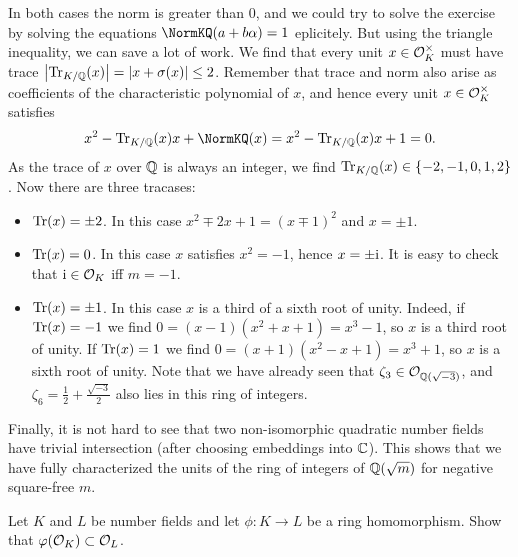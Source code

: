 \documentclass[a4paper,11pt]{article}
\begin{document}
\begin{enumerate}
\begin{equation*}
        \end{equation*}
        In both cases the norm is greater than $0$, and we could try to solve
        the exercise by solving the equations
        $\NormKQ(a + b\alpha) = 1$ eplicitely. But using the triangle
        inequality, we can save a lot of work. We find that every
        unit $x \in \mathcal{O}_K^\times$ must have trace $\left\lvert \operatorname{Tr}_{K/\mathbb{Q}}(x) \right\rvert = \left\lvert x +
        \sigma(x) \right\rvert \leq 2$. Remember that trace and norm also arise as coefficients
        of the characteristic polynomial of $x$, and hence every unit
        $x \in \mathcal{O}_K^\times$ satisfies
        \begin{equation*}
            x^2 - \Tr_{K/\Q}(x) x + \NormKQ(x) = x^2 - \Tr_{K/\Q}(x) x + 1 = 0.
        \end{equation*}
        As the trace of $x$ over $\mathbb{Q}$ is always an integer, we find 
        $\operatorname{Tr}_{K/\mathbb{Q}}(x) \in \{-2,-1,0,1,2\}$. 
        Now there are three tracases:
        \begin{itemize}
            \item $\operatorname{Tr}(x) = \pm 2$. In this case $x^2 \mp 2x + 1 = (x \mp 1)^2$
                and $x = \pm 1$. 
            \item $\operatorname{Tr}(x) = 0$. In this case $x$ satisfies $x^2 = -1$, hence
                $x = \pm \mathrm i$. It is easy to check that $\mathrm i \in \mathcal{O}_K$ iff 
                $m = -1$. 
            \item $\operatorname{Tr}(x) = \pm 1$. In this case $x$ is a third of a sixth root of
                unity. Indeed, if $\operatorname{Tr}(x) = -1$ we find $0 = (x-1)(x^2 + x + 1)
                = x^3 - 1$, so $x$ is a third root of unity. If $\operatorname{Tr}(x) = 1$ we
                find $0 = (x+1)(x^2 - x + 1) = x^3 + 1$, so $x$ is a sixth root
                of unity. Note that we have already seen that $\zeta_3 \in
                \mathcal{O}_{\mathbb{Q}(\sqrt{-3})}$, and $\zeta_6 = \frac 12 +
                \frac{\sqrt{-3}}2$ also lies in this ring of integers.  
        \end{itemize}
        Finally, it is not hard to see that two non-isomorphic quadratic number
        fields have trivial intersection (after choosing embeddings into $\mathbb{C}$).
        This shows that we have fully characterized the units of
        the ring of integers of $\mathbb{Q}(\sqrt m)$ for negative square-free $m$. 



\end{enumerate}

Let $K$ and $L$ be number fields and let $\phi: K \to L$ be a ring homomorphism.
Show that $\varphi(\mathcal{O}_K) \subset \mathcal{O}_L$.
\end{document}
